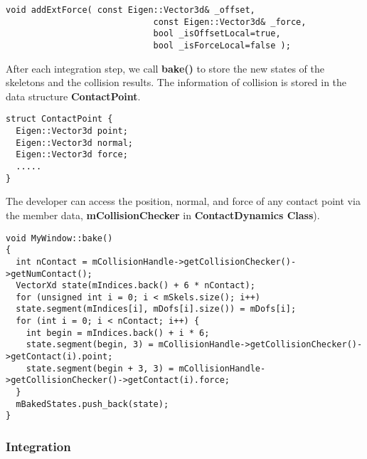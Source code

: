 \ttfamily
\begin{lstlisting}[caption=BodyNodeDynamics.h]
void addExtForce( const Eigen::Vector3d& _offset, 
                             const Eigen::Vector3d& _force, 
                             bool _isOffsetLocal=true, 
                             bool _isForceLocal=false );
\end{lstlisting}
\rmfamily

After each integration step, we call \textbf{bake()} to store the new
states of the skeletons and the collision results. The information of
collision is stored in the data structure \textbf{ContactPoint}.
\ttfamily
\begin{lstlisting}[caption=CollisionSkeleton.h]
struct ContactPoint {
  Eigen::Vector3d point;
  Eigen::Vector3d normal;
  Eigen::Vector3d force;
  .....
}
\end{lstlisting}
\rmfamily

The developer can access the position, normal, and force of any
contact point via the member data, \textbf{mCollisionChecker} in
\textbf{ContactDynamics Class}).  

\ttfamily
\begin{lstlisting}[caption=MyWindow.cpp]
void MyWindow::bake()
{
  int nContact = mCollisionHandle->getCollisionChecker()->getNumContact();
  VectorXd state(mIndices.back() + 6 * nContact);
  for (unsigned int i = 0; i < mSkels.size(); i++)
  state.segment(mIndices[i], mDofs[i].size()) = mDofs[i];
  for (int i = 0; i < nContact; i++) {
    int begin = mIndices.back() + i * 6;
    state.segment(begin, 3) = mCollisionHandle->getCollisionChecker()->getContact(i).point;
    state.segment(begin + 3, 3) = mCollisionHandle->getCollisionChecker()->getContact(i).force;
  }
  mBakedStates.push_back(state);
}
\end{lstlisting}
\rmfamily

\subsubsection{Integration}

